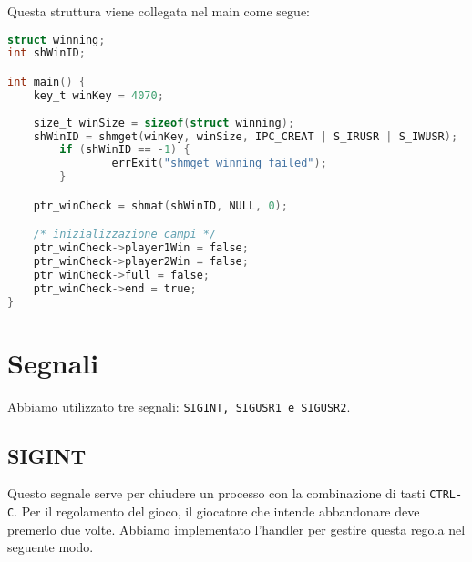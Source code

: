 \documentclass[a4paper,11pt]{article}
\begin{document}
Questa struttura viene collegata nel main come segue:
\begin{lstlisting}[language=C]
struct winning;
int shWinID;

int main() {
	key_t winKey = 4070;
	
	size_t winSize = sizeof(struct winning);
	shWinID = shmget(winKey, winSize, IPC_CREAT | S_IRUSR | S_IWUSR);
    	if (shWinID == -1) {
        		errExit("shmget winning failed");
    	}

	ptr_winCheck = shmat(shWinID, NULL, 0);

	/* inizializzazione campi */
	ptr_winCheck->player1Win = false;
	ptr_winCheck->player2Win = false;
	ptr_winCheck->full = false;
	ptr_winCheck->end = true;
}
\end{lstlisting}

\section{Segnali}

Abbiamo utilizzato tre segnali: \texttt{SIGINT, SIGUSR1 e SIGUSR2}.

\subsection{SIGINT}
Questo segnale serve per chiudere un processo con la combinazione di tasti \texttt{CTRL-C}. Per il regolamento del gioco, il giocatore che intende abbandonare deve premerlo due volte. Abbiamo implementato l'handler per gestire questa regola nel seguente modo.
\end{document}
